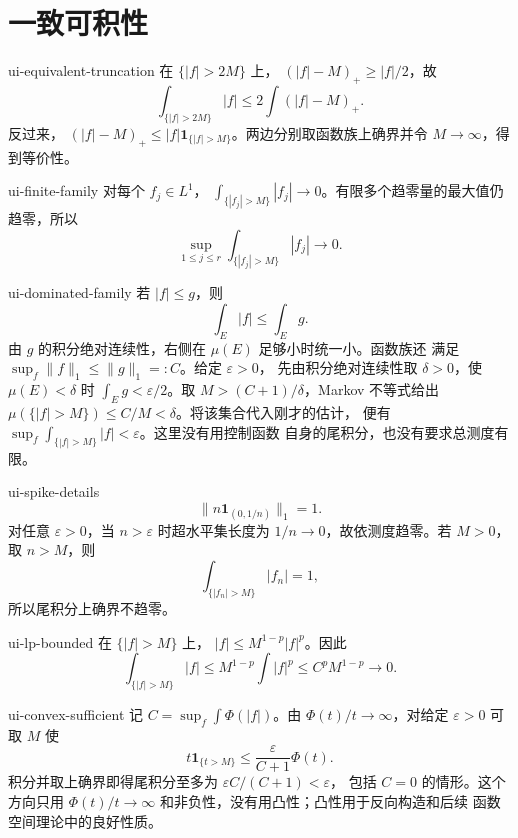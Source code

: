 \chapter{一致可积性}

\begin{solution}{ui-equivalent-truncation}
在 \(\{|f|>2M\}\) 上，
\((|f|-M)_+\ge|f|/2\)，故
\[
 \int_{\{|f|>2M\}}|f|
 \le2\int(|f|-M)_+.
\]
反过来，
\((|f|-M)_+\le|f|\mathbf1_{\{|f|>M\}}\)。两边分别取函数族上确界并令
\(M\to\infty\)，得到等价性。
\end{solution}

\begin{solution}{ui-finite-family}
对每个 \(f_j\in L^1\)，
\(\int_{\{|f_j|>M\}}|f_j|\to0\)。有限多个趋零量的最大值仍趋零，所以
\[
 \sup_{1\le j\le r}\int_{\{|f_j|>M\}}|f_j|\to0.
\]
\end{solution}

\begin{solution}{ui-dominated-family}
若 \(|f|\le g\)，则
\[
 \int_E|f|\le\int_Eg.
\]
由 \(g\) 的积分绝对连续性，右侧在 \(\mu(E)\) 足够小时统一小。函数族还
满足 \(\sup_f\|f\|_1\le\|g\|_1=:C\)。给定 \(\varepsilon>0\)，
先由积分绝对连续性取 \(\delta>0\)，使 \(\mu(E)<\delta\) 时
\(\int_Eg<\varepsilon/2\)。取 \(M>(C+1)/\delta\)，Markov 不等式给出
\(\mu(\{|f|>M\})\le C/M<\delta\)。将该集合代入刚才的估计，
便有 \(\sup_f\int_{\{|f|>M\}}|f|<\varepsilon\)。这里没有用控制函数
自身的尾积分，也没有要求总测度有限。
\end{solution}

\begin{solution}{ui-spike-details}
\[
 \|n\mathbf1_{(0,1/n)}\|_1=1.
\]
对任意 \(\varepsilon>0\)，当 \(n>\varepsilon\) 时超水平集长度为
\(1/n\to0\)，故依测度趋零。若 \(M>0\)，取 \(n>M\)，则
\[
 \int_{\{|f_n|>M\}}|f_n|=1,
\]
所以尾积分上确界不趋零。
\end{solution}

\begin{solution}{ui-lp-bounded}
在 \(\{|f|>M\}\) 上，
\(|f|\le M^{1-p}|f|^p\)。因此
\[
 \int_{\{|f|>M\}}|f|
 \le M^{1-p}\int|f|^p
 \le C^pM^{1-p}\to0.
\]
\end{solution}

\begin{solution}{ui-convex-sufficient}
记 \(C=\sup_f\int\Phi(|f|)\)。由
\(\Phi(t)/t\to\infty\)，对给定 \(\varepsilon>0\) 可取 \(M\) 使
\[
 t\mathbf1_{\{t>M\}}\le\frac{\varepsilon}{C+1}\Phi(t).
\]
积分并取上确界即得尾积分至多为 \(\varepsilon C/(C+1)<\varepsilon\)，
包括 \(C=0\) 的情形。这个方向只用
\(\Phi(t)/t\to\infty\) 和非负性，没有用凸性；凸性用于反向构造和后续
函数空间理论中的良好性质。
\end{solution}

